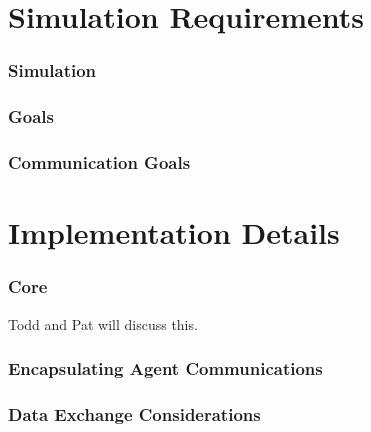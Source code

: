 \documentclass{beamer}
\begin{document}
\section{Simulation Requirements}

\begin{frame}
  \frametitle{Simulation}


\end{frame}


\begin{frame}
  \frametitle{Goals}



\end{frame}

\begin{frame}
  \frametitle{Communication Goals}



\end{frame}


\section{Implementation Details}

\begin{frame}
  \frametitle{Core}

  Todd and Pat will discuss this.

\end{frame}


\begin{frame}
  \frametitle{Encapsulating Agent Communications}


\end{frame}


\begin{frame}
  \frametitle{Data Exchange Considerations}
  

\end{frame}




%
%
%
%
\end{document}
